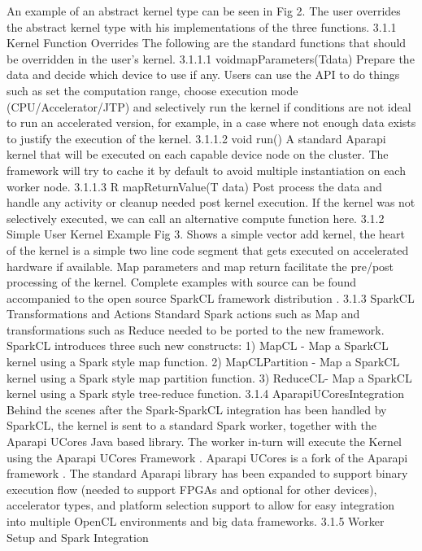 \documentclass[runningheads,a4paper]{llncs}
\begin{document}
An example of an abstract kernel type can be seen in Fig 2. The user overrides the abstract kernel type with his implementations of the three functions.
3.1.1 Kernel Function Overrides
The following are the standard functions that should be overridden in the user’s kernel.
3.1.1.1 voidmapParameters(Tdata)
Prepare the data and decide which device to use if any. Users can use the API to do things such as set the computation range, choose execution mode (CPU/Accelerator/JTP) and selectively run the kernel if conditions are not ideal to run an accelerated version, for example, in a case where not enough data exists to justify the execution of the kernel.
3.1.1.2 void run()
A standard Aparapi kernel that will be executed on each capable device node on the cluster. The framework will try to cache it by default to avoid multiple instantiation on each worker node.
3.1.1.3 R mapReturnValue(T data)
Post process the data and handle any activity or cleanup needed post kernel execution. If the kernel was not selectively executed, we can call an alternative compute function here.
3.1.2 Simple User Kernel Example
Fig 3. Shows a simple vector add kernel, the heart of the kernel is a simple two line code segment that gets executed on accelerated hardware if available. Map parameters and map return facilitate the pre/post processing of the kernel. Complete examples with source can be found accompanied to the open source SparkCL framework distribution \cite{SparkCL:2015}.
3.1.3 SparkCL Transformations and Actions
Standard Spark actions such as Map and transformations such as Reduce needed to be ported to the new framework. SparkCL introduces three such new constructs:
1) MapCL - Map a SparkCL kernel using a Spark style map function.
2) MapCLPartition - Map a SparkCL kernel using a Spark style map partition function.
3) ReduceCL- Map a SparkCL kernel using a Spark style tree-reduce function.
3.1.4 AparapiUCoresIntegration
Behind the scenes after the Spark-SparkCL integration has been handled by SparkCL, the kernel is sent to a standard Spark worker, together with the Aparapi UCores Java based library. The worker in-turn will execute the Kernel using the Aparapi UCores Framework \cite{AparapiUCores:2015}. Aparapi UCores is a fork of the Aparapi framework \cite{AparapiAPI:2012}. The standard Aparapi library has been expanded to support binary execution flow (needed to support FPGAs and optional for other devices), accelerator types, and platform selection support to allow for easy integration into multiple OpenCL environments and big data frameworks.
3.1.5 Worker Setup and Spark Integration
\end{document}
